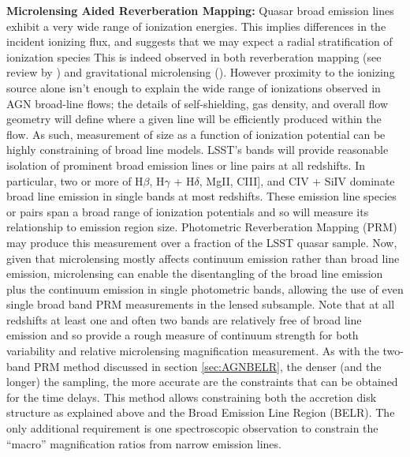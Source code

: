 {\bf Microlensing Aided Reverberation Mapping:} Quasar broad emission lines exhibit a very wide range of ionization energies. This implies differences in the incident ionizing flux, and suggests that we may expect a radial stratification of ionization species This is indeed observed in both reverberation mapping (see review by \citealt{gaskell2009}) and gravitational microlensing (\citealt{guerras2013}). However proximity to the ionizing source alone isn't enough to explain the wide range of ionizations observed in AGN broad-line flows; the details of self-shielding, gas density, and overall flow geometry will define where a given line will be efficiently produced within the flow. As such, measurement of size as a function of ionization potential can be highly constraining of broad line models. LSST's bands will provide reasonable isolation of prominent broad emission lines or line pairs at all redshifts. In particular, two or more of H$\beta$, H$\gamma$ + H$\delta$, MgII, CIII], and CIV + SiIV dominate broad line emission in single bands at most redshifts. These emission line species or pairs span a broad range of ionization potentials and so will measure its relationship to emission region size. Photometric Reverberation Mapping (PRM) may produce this measurement over a fraction of the LSST quasar sample. Now, given that microlensing mostly affects continuum emission rather than  broad line emission, microlensing can enable the disentangling of the broad line emission plus the continuum emission in single photometric bands, allowing the use of even single broad band PRM measurements \citep{SluseandTewes2014} in the lensed subsample. Note that at all redshifts at least one and often two bands are relatively free of broad line emission and so provide a rough measure of continuum strength for both variability and relative microlensing magnification measurement. As with the two-band PRM method discussed in section \ref{sec:AGNBELR}, the
denser (and the longer) the sampling, the more accurate are the constraints that
can be obtained for the time delays. This method allows constraining both the
accretion disk structure as explained above and the Broad Emission Line Region (BELR). The only additional
requirement is one spectroscopic observation to constrain the ``macro''
magnification ratios from narrow emission lines.


